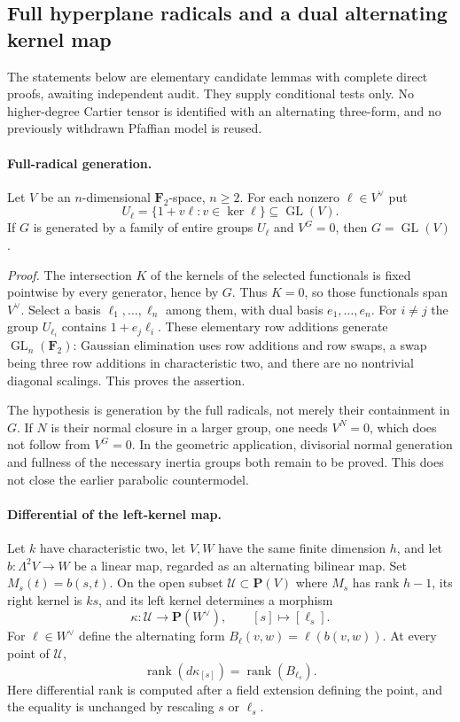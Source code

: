 \subsection*{Full hyperplane radicals and a dual alternating kernel map}

The statements below are elementary candidate lemmas with complete direct
proofs, awaiting independent audit. They supply conditional tests only.
No higher-degree Cartier tensor is identified with an alternating
three-form, and no previously withdrawn Pfaffian model is reused.

\paragraph{Full-radical generation.}
Let $V$ be an $n$-dimensional $\mathbf F_2$-space, $n\geq2$. For each
nonzero $\ell\in V^\vee$ put
\[
 U_\ell=\{1+v\ell:v\in\ker\ell\}\subseteq\operatorname{GL}(V).
\]
If $G$ is generated by a family of entire groups $U_\ell$ and $V^G=0$,
then $G=\operatorname{GL}(V)$.

\emph{Proof.} The intersection $K$ of the kernels of the selected
functionals is fixed pointwise by every generator, hence by $G$.
Thus $K=0$, so those functionals span $V^\vee$. Select a basis
$\ell_1,\ldots,\ell_n$ among them, with dual basis $e_1,\ldots,e_n$.
For $i\ne j$ the group $U_{\ell_i}$ contains $1+e_j\ell_i$.
These elementary row additions generate $\operatorname{GL}_n(\mathbf F_2)$:
Gaussian elimination uses row additions and row swaps, a swap being
three row additions in characteristic two, and there are no nontrivial
diagonal scalings. This proves the assertion.

The hypothesis is generation by the full radicals, not merely their
containment in $G$. If $N$ is their normal closure in a larger group,
one needs $V^N=0$, which does not follow from $V^G=0$. In the geometric
application, divisorial normal generation and fullness of the necessary
inertia groups both remain to be proved. This does not close the earlier
parabolic countermodel.

\paragraph{Differential of the left-kernel map.}
Let $k$ have characteristic two, let $V,W$ have the same finite dimension
$h$, and let $b:\Lambda^2V\to W$ be a linear map, regarded as an
alternating bilinear map. Set $M_s(t)=b(s,t)$. On the open subset
$\mathcal U\subset\mathbf P(V)$ where $M_s$ has rank $h-1$, its right
kernel is $ks$, and its left kernel determines a morphism
\[
 \kappa:\mathcal U\longrightarrow\mathbf P(W^\vee),
 \qquad [s]\longmapsto[\ell_s].
\]
For $\ell\in W^\vee$ define the alternating form
$B_\ell(v,w)=\ell(b(v,w))$. At every point of $\mathcal U$,
\[
             \operatorname{rank}(d\kappa_{[s]})
                      =\operatorname{rank}(B_{\ell_s}).
\]
Here differential rank is computed after a field extension defining the
point, and the equality is unchanged by rescaling $s$ or $\ell_s$.

